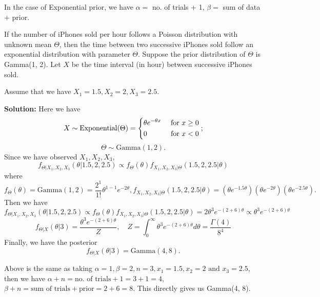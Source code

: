 In the case of Exponential prior, we have \(\alpha =\) no. of trials + 1, \(\beta =\) sum of data \(+\) prior. 

\begin{eg}
  If the number of iPhones sold per hour follows a Poisson distribution with unknown mean \(\Theta\), then the time between two successive iPhones sold follow an exponential distribution with parameter \(\Theta\). Suppose the prior distribution of \(\Theta\) is Gamma(1, 2). Let \(X\) be the time interval (in hour) between successive iPhones sold.

  Assume that we have \(X_1 = 1.5, X_2 = 2, X_3 = 2.5\). 

  \textbf{Solution:} 
  Here we have 
  \[
    X \sim \text{Exponential}(\Theta) = \begin{dcases}
      \theta e^{-\theta x} &\text{ for } x \geq 0 \\
      0  &\text{ for } x < 0 \\ 
    \end{dcases};
  \]
  \[
    \Theta \sim \text{Gamma}(1, 2). 
  \]
  Since we have observed \(X_1, X_2, X_3\), 
  \[
    f_{\Theta \vert X_1, X_2, X_3} (\theta \vert 1.5, 2, 2.5) \propto f_{\Theta} (\theta) f_{X_1, X_2, X_3 \vert \Theta} (1.5, 2, 2.5 \vert \theta)
  \]
  where
  \[
    f_{\Theta} (\theta) = \text{Gamma}(1, 2) = \dfrac{2^1}{1!}\theta^{1-1}e^{-2\theta}, f_{X_1, X_2, X_3 \vert \Theta} (1.5, 2, 2.5 \vert \theta) = (\theta e^{-1.5\theta}) (\theta e^{-2\theta}) (\theta e^{-2.5\theta}). 
  \]
  Then we have
  \[
    f_{\Theta \vert X_1, X_2, X_3} (\theta \vert 1.5, 2, 2.5) \propto f_{\Theta} (\theta) f_{X_1, X_2, X_3 \vert \Theta} (1.5, 2, 2.5 \vert \theta) = 2\theta^3 e^{-(2 + 6)\theta} \propto \theta^3 e^{-(2 + 6)\theta}
  \]
  \[
    f_{\Theta \vert X} (\theta \vert 3) = \dfrac{\theta^3 e^{-(2 + 6)\theta}}{Z},\quad Z = \int_{0}^{\infty} \theta^3 e^{-(2 + 6)\theta} d \theta = \dfrac{\Gamma(4)}{8^4}
  \]
  Finally, we have the posterior
  \[
    f_{\Theta \vert X} (\theta \vert 3) = \text{Gamma}(4, 8). 
  \]
\end{eg}

Above is the same as taking \(\alpha = 1, \beta = 2, n = 3, x_1 = 1.5, x_2 = 2 \text{ and } x_3 = 2.5\), then we have \(\alpha + n = \text{no. of trials} + 1 = 3 + 1= 4\), \(\beta + n = \text{sum of trials} + \text{prior} = 2 + 6 = 8\). This directly gives us Gamma(4, 8). 

